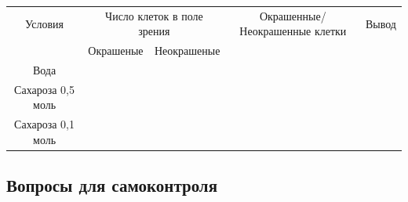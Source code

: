 \begin{table}[h!]
\centering
\label{plasmolis_table}
	\begin{tabular}{|c|c|c|c|c|}
	
		\hline Условия &	\multicolumn{2}{c|}{Число клеток в поле зрения} & Окрашенные/Неокрашенные клетки & Вывод \\ \cline{2-5}
		 & Окрашеные & Неокрашеные & & \\
		\hline Вода & & & & \\
		\hline Сахароза 0,5 моль & & & & \\
		\hline Сахароза 0,1 моль & & & & \\
		\hline
	
	\end{tabular}
\end{table}

\subsection*{Вопросы для самоконтроля}

